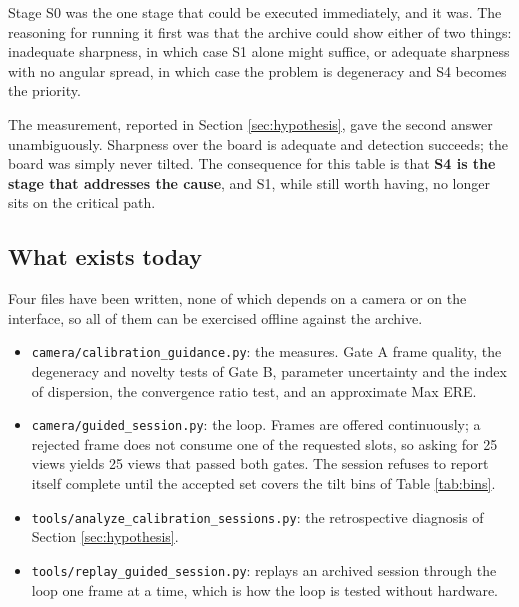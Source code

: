 Stage S0 was the one stage that could be executed immediately, and it was. The reasoning for running it first was that the archive could show either of two things: inadequate sharpness, in which case S1 alone might suffice, or adequate sharpness with no angular spread, in which case the problem is degeneracy and S4 becomes the priority.

The measurement, reported in Section \ref{sec:hypothesis}, gave the second answer unambiguously. Sharpness over the board is adequate and detection succeeds; the board was simply never tilted. The consequence for this table is that \textbf{S4 is the stage that addresses the cause}, and S1, while still worth having, no longer sits on the critical path.

\subsection{What exists today}

Four files have been written, none of which depends on a camera or on the interface, so all of them can be exercised offline against the archive.

\begin{itemize}
    \item \texttt{camera/calibration\_guidance.py}: the measures. Gate A frame quality, the degeneracy and novelty tests of Gate B, parameter uncertainty and the index of dispersion, the convergence ratio test, and an approximate Max ERE.
    \item \texttt{camera/guided\_session.py}: the loop. Frames are offered continuously; a rejected frame does not consume one of the requested slots, so asking for 25 views yields 25 views that passed both gates. The session refuses to report itself complete until the accepted set covers the tilt bins of Table \ref{tab:bins}.
    \item \texttt{tools/analyze\_calibration\_sessions.py}: the retrospective diagnosis of Section \ref{sec:hypothesis}.
    \item \texttt{tools/replay\_guided\_session.py}: replays an archived session through the loop one frame at a time, which is how the loop is tested without hardware.
\end{itemize}

